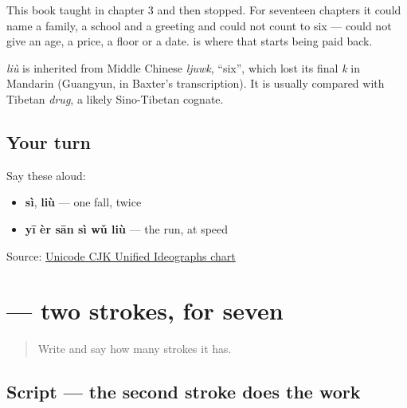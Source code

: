 \begin{grammarlens}[title={What you've built — the run starts again}]
This book taught      in chapter 3 and then stopped. For seventeen chapters it could name a family, a school and a greeting and could not count to six — could not give an age, a price, a floor or a date. \textbf{} is where that starts being paid back.
\end{grammarlens}

\begin{cousinweb}
\textbf{} \emph{liù} is inherited from Middle Chinese \emph{ljuwk}, \textquotedblleft{}six\textquotedblright{}, which lost its final \emph{k} in Mandarin (Guangyun, in Baxter's transcription). It is usually compared with Tibetan \emph{drug}, a likely Sino-Tibetan cognate.
\end{cousinweb}

\subsection*{Your turn}
Say these aloud:

\begin{itemize}
\raggedright
  \item \textbf{sì}, \textbf{liù} — one fall, twice
  \item \textbf{yī èr sān sì wǔ liù} — the run, at speed
\end{itemize}

\begin{tcolorbox}[breakable,colback=teal!4,colframe=teal!35!black,title={Before you move on}]
Source: \href{https://www.unicode.org/charts/PDF/U4E00.pdf}{Unicode CJK Unified Ideographs chart}
\end{tcolorbox}
\section[\texorpdfstring{\zh{七} (qī)}{七 (qī)}]{ — two strokes, for seven}

\label{lesson:ZH-W20-qi}



\begin{quote}
Write  and say how many strokes it has.
\end{quote}

\subsection*{Script — the second stroke does the work}


